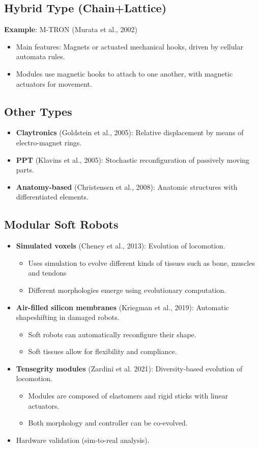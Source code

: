 \subsection*{Hybrid Type (Chain+Lattice)}
\textbf{Example}: M-TRON (Murata et al., 2002)
\begin{itemize}
    \item Main features: Magnets or actuated mechanical hooks, driven by cellular automata rules.
    \item Modules use magnetic hooks to attach to one another, with magnetic actuators for movement.
\end{itemize}

\subsection*{Other Types}
\begin{itemize}
    \item \textbf{Claytronics} (Goldstein et al., 2005): Relative displacement by means of electro-magnet rings.
    \item \textbf{PPT} (Klavins et al., 2005): Stochastic reconfiguration of passively moving parts.
    \item \textbf{Anatomy-based} (Christensen et al., 2008): Anatomic structures with differentiated elements.
\end{itemize}

\subsection*{Modular Soft Robots}
\begin{itemize}
   \item  \textbf{Simulated voxels} (Cheney et al., 2013): Evolution of locomotion.
    \begin{itemize}
    \item Uses simulation to evolve different kinds of tissues such as bone, muscles and tendons
    \item  Different morphologies emerge using evolutionary computation.
    \end{itemize}
    \item \textbf{Air-filled silicon membranes} (Kriegman et al., 2019): Automatic shapeshifting in damaged robots.
    \begin{itemize}
    \item  Soft robots can automatically reconfigure their shape.
    \item Soft tissues allow for flexibility and compliance.
    \end{itemize}
   \item  \textbf{Tensegrity modules} (Zardini et al. 2021): Diversity-based evolution of locomotion.
   \begin{itemize}
    \item  Modules are composed of elastomers and rigid sticks with linear actuators.
    \item Both morphology and controller can be co-evolved.
   \end{itemize}
    \item  Hardware validation (sim-to-real analysis).
\end{itemize}

